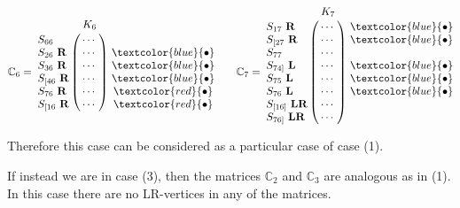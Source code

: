 \documentclass[12pt]{book}
\theoremstyle{plain}
\theoremstyle{remark}
\begin{document}
\[   \mathbb C_6 = \bordermatrix{ & K_6\cr
                S_{66}\            & \cdots \cr
                S_{26}\ \textbf{R} & \cdots \cr
                S_{36}\ \textbf{R} & \cdots \cr
                S_{[46}\ \textbf{R} & \cdots \cr
                S_{76}\ \textbf{R} & \cdots \cr
                S_{[16}\ \textbf{R} & \cdots }\
                \begin{matrix}
                \\ \\  \textcolor{blue}{\bullet} \\  \textcolor{blue}{\bullet} \\ \textcolor{blue}{\bullet} \\ \textcolor{red}{\bullet} \\ \textcolor{red}{\bullet} \\ \\ 
                \end{matrix}  \qquad
    \mathbb C_7 = \bordermatrix{ & K_7\cr
				S_{17}\ \textbf{R} & \cdots \cr
				S_{[27}\ \textbf{R} & \cdots \cr
                S_{77}\            & \cdots \cr
                S_{74]}\ \textbf{L} & \cdots \cr
                S_{75}\ \textbf{L} & \cdots \cr
                S_{76}\ \textbf{L} & \cdots \cr
                S_{[16]}\ \textbf{LR} & \cdots \cr
                S_{76]}\ \textbf{LR} & \cdots }\
                \begin{matrix}
                \textcolor{blue}{\bullet} \\  \textcolor{blue}{\bullet} \\ \\ \textcolor{blue}{\bullet} \\ \textcolor{blue}{\bullet} \\ \textcolor{blue}{\bullet}  \\ \\ \\
                \end{matrix}  \]
                
Therefore this case can be considered as a particular case of case (1).

If instead we are in case (3), then the matrices $\mathbb C_2$ and $\mathbb{C}_3$ are analogous as in (1). In this case there are no LR-vertices in any of the matrices. 
\end{document}
